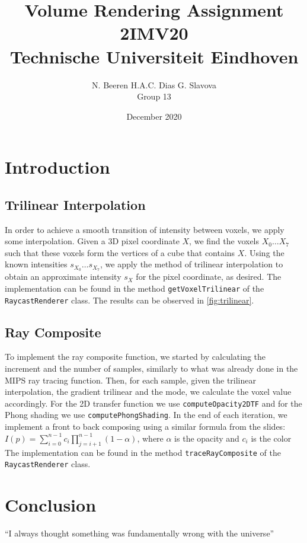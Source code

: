 \documentclass[a4paper]{article}
\title{Volume Rendering Assignment\\2IMV20\\Technische Universiteit Eindhoven}
\author{N. Beeren \quad H.A.C. Dias \quad G. Slavova\\Group 13}
\date{December 2020}
\begin{document}
\maketitle

\section{Introduction}

\subsection{Trilinear Interpolation}

In order to achieve a smooth transition of intensity between voxels, we apply some interpolation. Given a 3D pixel coordinate $X$, we find the voxels $X_0 \ldots X_7$ such that these voxels form the vertices of a cube that contains $X$. Using the known intensities $s_{X_0}\ldots s_{X_7}$, we apply the method of trilinear interpolation to obtain an approximate intensity $s_X$ for the pixel coordinate, as desired. The implementation can be found in the method {\tt getVoxelTrilinear} of the {\tt RaycastRenderer} class. The results can be observed in \autoref{fig:trilinear}.

\subsection{Ray Composite}

To implement the ray composite function, we started by calculating the increment and the number of samples, similarly to what was already done in the MIPS ray tracing function. Then, for each sample, given the trilinear interpolation, the gradient trilinear and the mode, we calculate the voxel value accordingly. For the 2D transfer function we use {\tt computeOpacity2DTF} and for the Phong shading we use {\tt computePhongShading}. In the end of each iteration, we implement a front to back composing using a similar formula from the slides: $I(p)=\sum^{n-1}_{i=0}c_i\prod^{n-1}_{j=i+1}(1-\alpha)$, where $\alpha$ is the opacity and $c_i$ is the color The implementation can be found in the method {\tt traceRayComposite} of the {\tt RaycastRenderer} class.


\section{Conclusion}
``I always thought something was fundamentally wrong with the universe'' \citep{adams1995hitchhiker}
\end{document}
